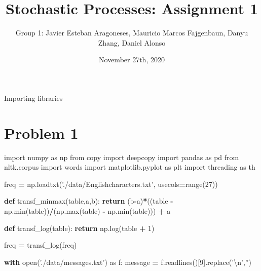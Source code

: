 \documentclass[]{article}
\title{Stochastic Processes: Assignment 1}
\author{Group 1: Javier Esteban Aragoneses, Mauricio Marcos Fajgenbaun, Danyu
Zhang, Daniel Alonso}
\date{November 27th, 2020}
\newenvironment{Shaded}{\begin{snugshade}}{\end{snugshade}}
\newcommand{\BuiltInTok}[1]{#1}
\newcommand{\CharTok}[1]{\textcolor[rgb]{0.31,0.60,0.02}{#1}}
\newcommand{\ControlFlowTok}[1]{\textcolor[rgb]{0.13,0.29,0.53}{\textbf{#1}}}
\newcommand{\DecValTok}[1]{\textcolor[rgb]{0.00,0.00,0.81}{#1}}
\newcommand{\ImportTok}[1]{#1}
\newcommand{\KeywordTok}[1]{\textcolor[rgb]{0.13,0.29,0.53}{\textbf{#1}}}
\newcommand{\NormalTok}[1]{#1}
\newcommand{\OperatorTok}[1]{\textcolor[rgb]{0.81,0.36,0.00}{\textbf{#1}}}
\newcommand{\StringTok}[1]{\textcolor[rgb]{0.31,0.60,0.02}{#1}}
\begin{document}
\maketitle

Importing libraries

\hypertarget{problem-1}{%
\section{Problem 1}\label{problem-1}}

\begin{Shaded}
\begin{Highlighting}[]
\ImportTok{import}\NormalTok{ numpy }\ImportTok{as}\NormalTok{ np}
\ImportTok{from}\NormalTok{ copy }\ImportTok{import}\NormalTok{ deepcopy}
\ImportTok{import}\NormalTok{ pandas }\ImportTok{as}\NormalTok{ pd}
\ImportTok{from}\NormalTok{ nltk.corpus }\ImportTok{import}\NormalTok{ words}
\ImportTok{import}\NormalTok{ matplotlib.pyplot }\ImportTok{as}\NormalTok{ plt}
\ImportTok{import}\NormalTok{ threading }\ImportTok{as}\NormalTok{ th}

\NormalTok{freq }\OperatorTok{=}\NormalTok{  np.loadtxt(}\StringTok{'./data/Englishcharacters.txt'}\NormalTok{, usecols}\OperatorTok{=}\BuiltInTok{range}\NormalTok{(}\DecValTok{27}\NormalTok{))}

\KeywordTok{def}\NormalTok{ transf_minmax(table,a,b):}
    \ControlFlowTok{return}\NormalTok{ (b}\OperatorTok{-}\NormalTok{a)}\OperatorTok{*}\NormalTok{((table }\OperatorTok{-}\NormalTok{ np.}\BuiltInTok{min}\NormalTok{(table))}\OperatorTok{/}\NormalTok{(np.}\BuiltInTok{max}\NormalTok{(table) }\OperatorTok{-}\NormalTok{ np.}\BuiltInTok{min}\NormalTok{(table))) }\OperatorTok{+}\NormalTok{ a }

\KeywordTok{def}\NormalTok{ transf_log(table):}
    \ControlFlowTok{return}\NormalTok{ np.log(table }\OperatorTok{+} \DecValTok{1}\NormalTok{)}

\NormalTok{freq }\OperatorTok{=}\NormalTok{ transf_log(freq)}

\ControlFlowTok{with} \BuiltInTok{open}\NormalTok{(}\StringTok{'./data/messages.txt'}\NormalTok{) }\ImportTok{as}\NormalTok{ f:}
\NormalTok{    message }\OperatorTok{=}\NormalTok{ f.readlines()[}\DecValTok{9}\NormalTok{].replace(}\StringTok{'}\CharTok{\textbackslash{}n}\StringTok{'}\NormalTok{,}\StringTok{''}\NormalTok{)}


\end{Highlighting}
\end{Shaded}
\end{document}
